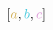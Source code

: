 \documentclass[preview]{standalone}
\begin{document}
$\left[\textcolor[HTML]{d2b057}{a}, \textcolor[HTML]{43c8dc}{b}, \textcolor[HTML]{dd99d8}{c}\right]$
\end{document}
